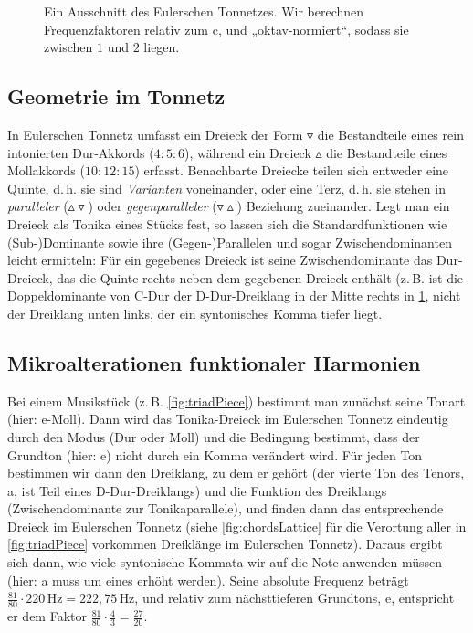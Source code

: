 \begin{figure}[h]
  
  \caption{Ein Ausschnitt des Eulerschen Tonnetzes. Wir berechnen
    Frequenzfaktoren relativ zum c, und „oktav-normiert“, sodass sie zwischen
    $1$ und $2$ liegen.}\label{fig:latticeExcerpt}
\end{figure}

\subsection{Geometrie im Tonnetz}

In Eulerschen Tonnetz umfasst ein Dreieck der Form $\triangledown$ die
Bestandteile eines rein intonierten Dur-Akkords ($4:5:6$), während ein Dreieck
$\vartriangle$ die Bestandteile eines Mollakkords ($10:12:15$)
erfasst. Benachbarte Dreiecke teilen sich entweder eine Quinte, d.\,h. sie sind
\emph{Varianten} voneinander, oder eine Terz, d.\,h. sie stehen in
\emph{paralleler} ($\vartriangle\!\!\!\triangledown$) oder
\emph{gegenparalleler} ($\triangledown\!\!\!\vartriangle$) Beziehung
zueinander. Legt man ein Dreieck als Tonika eines Stücks fest, so lassen sich
die Standardfunktionen wie \mbox{(Sub-)}Dominante sowie ihre (Gegen-)Parallelen und
sogar Zwischendominanten leicht ermitteln: Für ein gegebenes Dreieck ist seine
Zwischendominante das Dur-Dreieck, das die Quinte rechts neben dem gegebenen
Dreieck enthält (z.\,B.  ist die Doppeldominante von C-Dur der D-Dur-Dreiklang
in der Mitte rechts in \cref{fig:latticeExcerpt}, nicht der Dreiklang unten
links, der ein syntonisches Komma tiefer liegt.

\subsection{Mikroalterationen funktionaler Harmonien}

Bei einem Musikstück (z.\,B. \cref{fig:triadPiece}) bestimmt man zunächst seine
Tonart (hier: e-Moll). Dann wird das Tonika-Dreieck im Eulerschen Tonnetz
eindeutig durch den Modus (Dur oder Moll) und die Bedingung bestimmt, dass der
Grundton (hier: e) nicht durch ein Komma verändert wird. Für jeden Ton bestimmen
wir dann den Dreiklang, zu dem er gehört (der vierte Ton des Tenors, a, ist Teil
eines D-Dur-Dreiklangs) und die Funktion des Dreiklangs (Zwischendominante zur
Tonikaparallele), und finden dann das entsprechende Dreieck im Eulerschen
Tonnetz (siehe \cref{fig:chordsLattice} für die Verortung aller in
\cref{fig:triadPiece} vorkommen Dreiklänge im Eulerschen Tonnetz). Daraus ergibt
sich dann, wie viele syntonische Kommata wir auf die Note anwenden müssen (hier:
a muss um eines erhöht werden). Seine absolute Frequenz beträgt
$\frac{81}{80}\cdot 220\,\text{Hz}=222{,}75\,\text{Hz}$, und relativ zum
nächsttieferen Grundtons, e, entspricht er dem Faktor
$\frac{81}{80}\cdot\frac{4}{3}=\frac{27}{20}$.

